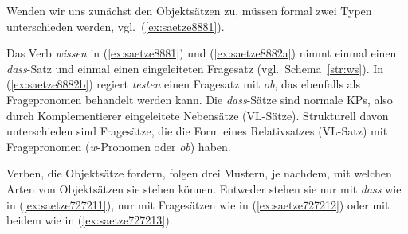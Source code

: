 
Wenden wir uns zunächst den Objektsätzen zu, müssen formal zwei Typen unterschieden werden, vgl.\ (\ref{ex:saetze8881}).

\begin{exe}
  \ex\label{ex:saetze8882}
  \begin{xlist}
  \end{xlist}
\end{exe}

Das Verb \textit{wissen} in (\ref{ex:saetze8881}) und (\ref{ex:saetze8882a}) nimmt einmal einen \textit{dass}-Satz und einmal einen eingeleiteten Fragesatz (vgl.\ Schema~\ref{str:ws}).
In (\ref{ex:saetze8882b}) regiert \textit{testen} einen Fragesatz mit \textit{ob}, das ebenfalls als Fragepronomen behandelt werden kann.
Die \textit{dass}-Sätze sind normale KPs, also durch Komplementierer eingeleitete Nebensätze (VL-Sätze).
Strukturell davon unterschieden sind Fragesätze, die die Form eines Relativsatzes (VL-Satz) mit Fragepronomen (\textit{w}-Pronomen oder \textit{ob}) haben.

Verben, die Objektsätze fordern, folgen drei Mustern, je nachdem, mit welchen Arten von Objektsätzen sie stehen können.
Entweder stehen sie nur mit \textit{dass} wie in (\ref{ex:saetze727211}), nur mit Fragesätzen wie in (\ref{ex:saetze727212}) oder mit beidem wie in (\ref{ex:saetze727213}).

\begin{exe}
  \ex\label{ex:saetze727211} 
  \begin{xlist}
  \end{xlist}
  \ex\label{ex:saetze727212} 
  \begin{xlist}
  \end{xlist}
  \ex\label{ex:saetze727213} 
  \begin{xlist}
  \end{xlist}
\end{exe}

